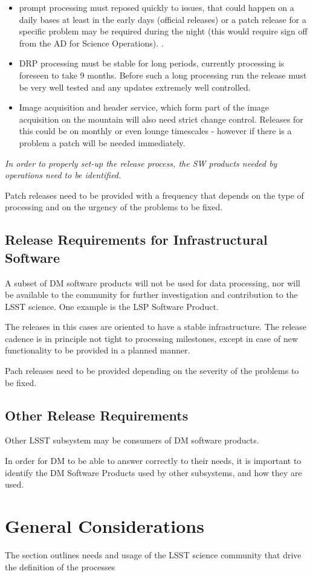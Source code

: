 \begin{itemize}
\item prompt processing must reposed quickly to issues, that could happen on a daily bases at least in the early days (official releases)
 or a  patch release  for a specific problem may be required during the night (this would require sign off from the AD for Science Operations).  .
\item DRP processing  must be stable for long periods, currently processing is foreseen to take 9 months.  Before such a long processing run the release must be very well tested and any updates extremely well controlled.
\item Image acquisition and header service, which form part of the image acquisition on the mountain will also need strict change control. Releases for this could be on monthly or even lounge timescales - however if there is a problem a patch will be needed immediately.
\end{itemize}

\textit{In order to properly set-up the release process, the SW products needed by operations need to be identified.}

Patch releases need to be provided with a frequency that depends on the type of processing
and on the urgency of the problems to be fixed.


\subsection{Release Requirements for Infrastructural Software} \label{sec:infreqs}

A subset of DM software products will not be used for data processing,
nor will be available to the community for further investigation and contribution to the LSST science.
One example is the LSP Software Product.

The releases in this cases are oriented to have a stable infrastructure.
The release cadence is in principle not tight to processing milestones,
except in case of new functionality to be provided in a planned manner.

Pach releases need to be provided depending on the severity of the problems to be fixed.


\subsection{Other Release Requirements} \label{other:reqs}

Other LSST subsystem may be consumers of DM software products.

In order for DM to be able to answer correctly to their needs,
it is important to identify the DM Software Products used by other subsystems,
and how they are used.


\newpage
\section{General Considerations} \label{sec:considerations}

The section outlines needs and usage of the LSST science community that drive the definition of the processes
